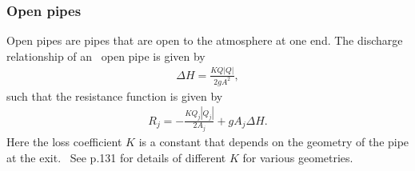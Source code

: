 \subsubsection{Open pipes}

Open pipes are pipes that are open to the atmosphere at one end. The discharge relationship of an \ 
open pipe is given by 
\begin{align}
    \Delta H = \frac{K Q |Q|}{2 g A^2},
\end{align}
such that the resistance function is given by
\begin{align}
    \boxed{ R_j = - \frac{K Q_j |Q_j|}{2 A_j} + g A_j \Delta H. }
\end{align}
Here the loss coefficient $K$ is a constant that depends on the geometry of the pipe at the exit. \
See \cite{rennels22} p.131 for details of different $K$ for various geometries.


